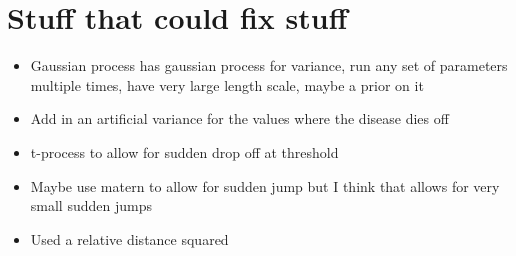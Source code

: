 \chapter{Stuff that could fix stuff}

\begin{itemize}
    \item Gaussian process has gaussian process for variance, run any set of parameters multiple times, have very large length scale, maybe a prior on it
    \item Add in an artificial variance for the values where the disease dies off
    \item t-process to allow for sudden drop off at threshold
    \item Maybe use matern to allow for sudden jump but I think that allows for very small sudden jumps
    \item Used a relative distance squared
\end{itemize}